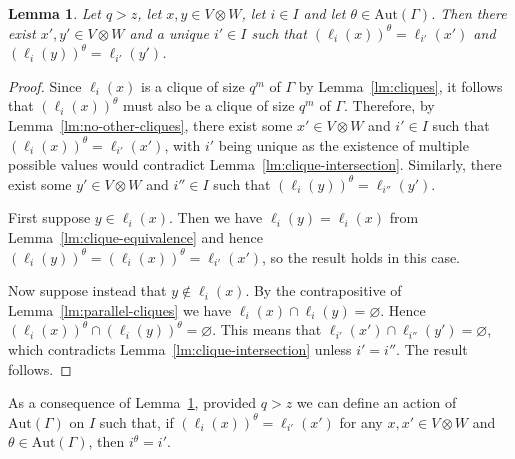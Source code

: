 \documentclass[10pt]{amsart}
\theoremstyle{definition}
\theoremstyle{plain}
\newtheorem{lemma}[lemma]{Lemma}
\theoremstyle{plain}
\theoremstyle{plain}
\theoremstyle{plain}
\newcommand{\Aut}{\mathrm{Aut}}
\begin{document}
\begin{lemma} \label{lm:automorphisms-permute-parallel-classes}
Let $q > z$, let $x, y \in V \otimes W$, let $i \in I$ and let $\theta \in \Aut{\left(\Gamma \right)}$. Then there exist $x', y' \in V \otimes W$ and a unique $i' \in I$ such that $\left(\ell_i{\left(x \right)}\right)^\theta = \ell_{i'}{\left(x' \right)}$ and $\left(\ell_i{\left(y \right)}\right)^\theta = \ell_{i'}{\left(y' \right)}$.
\end{lemma}
\begin{proof}
Since $\ell_i{\left(x \right)}$ is a clique of size $q^m$ of $\Gamma$ by Lemma~\ref{lm:cliques}, it follows that $\left(\ell_i{\left(x \right)}\right)^\theta$ must also be a clique of size $q^m$ of $\Gamma$. Therefore, by Lemma~\ref{lm:no-other-cliques}, there exist some $x' \in V \otimes W$ and $i' \in I$ such that $\left(\ell_i{\left(x \right)}\right)^\theta = \ell_{i'}{\left(x' \right)}$, with $i'$ being unique as the existence of multiple possible values would contradict Lemma~\ref{lm:clique-intersection}. Similarly, there exist some $y' \in V \otimes W$ and $i'' \in I$ such that $\left(\ell_i{\left(y \right)}\right)^\theta = \ell_{i''}{\left(y' \right)}$.

First suppose $y \in \ell_i{\left(x \right)}$. Then we have $\ell_i{\left(y \right)} = \ell_i{\left(x \right)}$ from Lemma~\ref{lm:clique-equivalence} and hence $\left(\ell_i{\left(y \right)}\right)^\theta = \left(\ell_i{\left(x \right)}\right)^\theta = \ell_{i'}{\left(x' \right)}$, so the result holds in this case.

Now suppose instead that $y \notin \ell_i{\left(x \right)}$. By the contrapositive of Lemma~\ref{lm:parallel-cliques} we have $\ell_i{\left(x \right)} \cap \ell_i{\left(y \right)} = \varnothing$. Hence $\left(\ell_i{\left(x \right)}\right)^\theta \cap \left(\ell_i{\left(y \right)}\right)^\theta = \varnothing$. This means that $\ell_{i'}{\left(x' \right)} \cap \ell_{i''}{\left(y' \right)} = \varnothing$, which contradicts Lemma~\ref{lm:clique-intersection} unless $i' = i''$. The result follows.
\end{proof}

As a consequence of Lemma~\ref{lm:automorphisms-permute-parallel-classes}, provided $q > z$ we can define an action of $\Aut{\left(\Gamma \right)}$ on $I$ such that, if $\left(\ell_i{\left(x \right)}\right)^\theta = \ell_{i'}{\left(x' \right)}$ for any $x, x' \in V \otimes W$ and $\theta \in \Aut{\left(\Gamma \right)}$, then $i^\theta = i'$.
\end{document}
